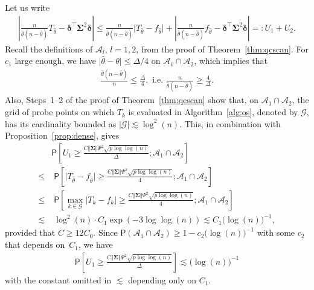 \documentclass[11pt, a4paper]{article}
\newcommand{\mc}{\mathcal}
\renewcommand{\l}{\left}
\renewcommand{\r}{\right}
\def\wh{\widehat}
\newcommand{\cp}{\theta}
\newcommand{\p}{\mathsf{P}}
\newcommand{\nn}{\nonumber}
\theoremstyle{definition}
\theoremstyle{definition}
\theoremstyle{definition}
\theoremstyle{definition}
\theoremstyle{definition}
\theoremstyle{remark}
\theoremstyle{definition}
\theoremstyle{definition}
\theoremstyle{definition}
\begin{document}
Let us write
\begin{align*}
\l\vert \frac{n}{\wh\cp(n - \wh\cp)} T_{\wh\cp} - \bm\delta^\top \bm\Sigma^2 \bm\delta \r\vert \le \frac{n}{\wh\cp(n - \wh\cp)} \vert T_{\wh\cp} - f_{\wh\cp} \vert + \l\vert \frac{n}{\wh\cp(n - \wh\cp)} f_{\wh\cp} - \bm\delta^\top \bm\Sigma^2 \bm\delta \r\vert =: U_1 + U_2.
\end{align*}
Recall the definitions of $\mc A_l, \, l = 1, 2$, from the proof of Theorem~\ref{thm:qcscan}.
For $c_1$ large enough, we have $\vert \wh\cp - \cp \vert \le \Delta/4$ on $\mc A_1 \cap \mc A_2$, which implies that
\begin{align}
\frac{\wh\cp (n - \wh\cp)}{n} \le \frac{\Delta}{4}, \text{ \ i.e. \ }
\frac{n}{\wh\cp(n - \wh\cp)} \ge \frac{4}{\Delta}.
\nn %
\end{align}
Also, Steps~1--2 of the proof of Theorem~\ref{thm:qcscan} show that, on $\mc A_1 \cap \mc A_2$, the grid of probe points on which $T_k$ is evaluated in Algorithm~\ref{alg:os}, denoted by $\mc G$, has its cardinality bounded as $\vert \mc G \vert \lesssim \log^2(n)$.
This, in combination with Proposition~\ref{prop:dense}, gives
\begin{align*}
& \p\l[ U_1 \ge \frac{C \Vert \bm\Sigma \Vert \Psi^2 \sqrt{p \log\log(n)}}{\Delta}; \mc A_1 \cap \mc A_2 \r] 
\\
\le & \; \p\l[ \vert T_{\wh\cp} - f_{\wh\cp} \vert \ge \frac{C \Vert \bm\Sigma \Vert \Psi^2 \sqrt{p \log\log(n)}}{4} ; \mc A_1 \cap \mc A_2 \r] 
\\
\le & \; \p\l[ \max_{k \in \mc G} \vert T_k - f_k \vert \ge \frac{C \Vert \bm\Sigma \Vert \Psi^2 \sqrt{p \log\log(n)}}{4} ; \mc A_1 \cap \mc A_2 \r] 
\\
\lesssim & \; \log^2(n) \cdot C_1 \exp(-3\log\log(n)) \lesssim C_1 \bigl(\log(n)\bigr)^{-1},
\end{align*}
provided that $C \ge 12 C_0$.
Since $\p(\mc A_1 \cap \mc A_2) \ge 1 - c_2 \bigl(\log(n)\bigr)^{-1}$ with some $c_2$ that depends on~$C_1$, we have
\begin{align*}
\p\l[ U_1 \ge \frac{C \Vert \bm\Sigma \Vert \Psi^2 \sqrt{p \log\log(n)}}{\Delta} \r] \lesssim \bigl(\log(n)\bigr)^{-1}
\end{align*}
with the constant omitted in $\lesssim$ depending only on $C_1$.
\end{document}

